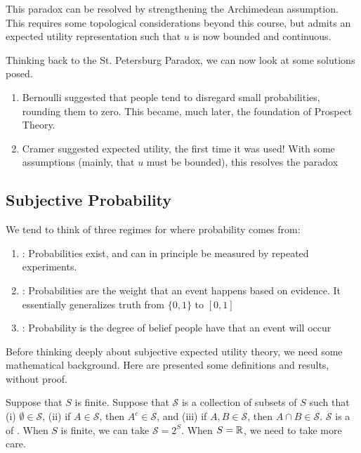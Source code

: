 \documentclass[12pt]{article}
\begin{document}
This paradox can be resolved by strengthening the Archimedean assumption. This requires some topological considerations beyond this course, but admits an expected utility representation such that $u$ is now bounded and continuous.


\begin{remark}
	Thinking back to the St. Petersburg Paradox, we can now look at some solutions posed.
	\begin{enumerate}
		\item Bernoulli suggested that people tend to disregard small probabilities, rounding them to zero. This became, much later, the foundation of Prospect Theory.
		\item Cramer suggested expected utility, the first time it was used! With some assumptions (mainly, that $u$ must be bounded), this resolves the paradox
	\end{enumerate}
\end{remark}

\subsection{Subjective Probability}

We tend to think of three regimes for where probability comes from:
\begin{enumerate}
	\item {}: Probabilities exist, and can in principle be measured by repeated experiments.
	\item {}: Probabilities are the weight that an event happens based on evidence. It essentially generalizes truth from $\{0,1\}$ to $[0,1]$
	\item {}: Probability is the degree of belief people have that an event will occur
\end{enumerate}

Before thinking deeply about subjective expected utility theory, we need some mathematical background. Here are presented some definitions and results, without proof.

\begin{definition}
	Suppose that $S$ is finite. Suppose that $\mathcal{S}$ is a collection of subsets of $S$ such that (i) $\emptyset \in \mathcal{S}$, (ii) if $A \in \mathcal{S}$, then $A^c \in \mathcal{S}$, and (iii) if $A,B \in \mathcal{S}$, then $A \cap B \in \mathcal{S}$. $\mathcal{S}$ is a  of . When $S$ is finite, we can take $\mathcal{S} = 2^S$. When $S = \mathbb{R}$, we need to take more care.
\end{definition}
\end{document}

